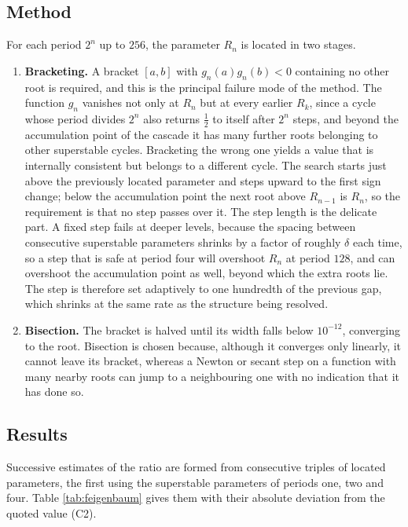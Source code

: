 \documentclass[11pt,a4paper]{article}
\theoremstyle{definition}
\theoremstyle{remark}
\begin{document}
\subsection{Method}

For each period $2^{n}$ up to $256$, the parameter $R_n$ is located in two
stages.

\begin{enumerate}
  \item \textbf{Bracketing.} A bracket $[a,b]$ with $g_n(a)g_n(b)<0$
    containing no other root is required, and this is the principal failure
    mode of the method. The function $g_n$ vanishes not only at $R_n$ but at
    every earlier $R_k$, since a cycle whose period divides $2^{n}$ also
    returns $\tfrac12$ to itself after $2^{n}$ steps, and beyond the
    accumulation point of the cascade it has many further roots belonging to
    other superstable cycles. Bracketing the wrong one yields a value that is
    internally consistent but belongs to a different cycle. The search starts
    just above the previously located parameter and steps upward to the first
    sign change; below the accumulation point the next root above $R_{n-1}$
    is $R_n$, so the requirement is that no step passes over it. The step
    length is the delicate part. A fixed step fails at deeper levels, because
    the spacing between consecutive superstable parameters shrinks by a factor
    of roughly $\delta$ each time, so a step that is safe at period four will
    overshoot $R_n$ at period $128$, and can overshoot the accumulation point
    as well, beyond which the extra roots lie. The step is therefore set
    adaptively to one hundredth of the previous gap, which shrinks at the same
    rate as the structure being resolved.
  \item \textbf{Bisection.} The bracket is halved until its width falls below
    $10^{-12}$, converging to the root. Bisection is chosen because, although
    it converges only linearly, it cannot leave its bracket, whereas a Newton
    or secant step on a function with many nearby roots can jump to a
    neighbouring one with no indication that it has done so.
\end{enumerate}

\subsection{Results}

Successive estimates of the ratio are formed from consecutive triples of
located parameters, the first using the superstable parameters of periods
one, two and four. Table \ref{tab:feigenbaum} gives them with their absolute
deviation from the quoted value (C2).
\end{document}

